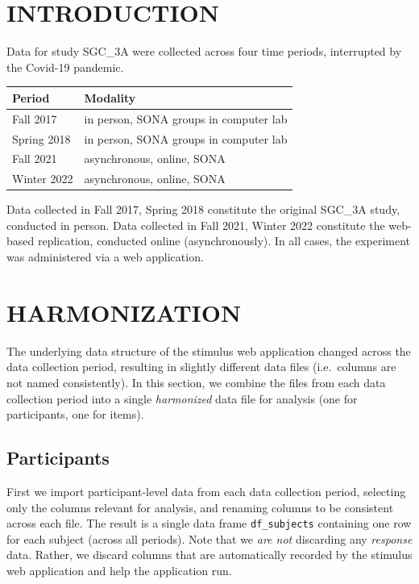 \documentclass[
  letterpaper,
  DIV=11,
  numbers=noendperiod]{scrreprt}
\begin{document}
\hypertarget{introduction}{%
\chapter{INTRODUCTION}\label{introduction}}

Data for study SGC\_3A were collected across four time periods,
interrupted by the Covid-19 pandemic.

\begin{longtable}[]{@{}ll@{}}
\toprule()
Period & Modality \\
\midrule()
\endhead
Fall 2017 & in person, SONA groups in computer lab \\
Spring 2018 & in person, SONA groups in computer lab \\
Fall 2021 & asynchronous, online, SONA \\
Winter 2022 & asynchronous, online, SONA \\
\bottomrule()
\end{longtable}

Data collected in Fall 2017, Spring 2018 constitute the original SGC\_3A
study, conducted in person. Data collected in Fall 2021, Winter 2022
constitute the web-based replication, conducted online (asynchronously).
In all cases, the experiment was administered via a web application.

\hypertarget{harmonization-1}{%
\chapter{HARMONIZATION}\label{harmonization-1}}

The underlying data structure of the stimulus web application changed
across the data collection period, resulting in slightly different data
files (i.e.~columns are not named consistently). In this section, we
combine the files from each data collection period into a single
\emph{harmonized} data file for analysis (one for participants, one for
items).

\hypertarget{participants}{%
\section{Participants}\label{participants}}

First we import participant-level data from each data collection period,
selecting only the columns relevant for analysis, and renaming columns
to be consistent across each file. The result is a single data frame
\texttt{df\_subjects} containing one row for each subject (across all
periods). Note that we \emph{are not} discarding any \emph{response}
data. Rather, we discard columns that are automatically recorded by the
stimulus web application and help the application run.
\end{document}
